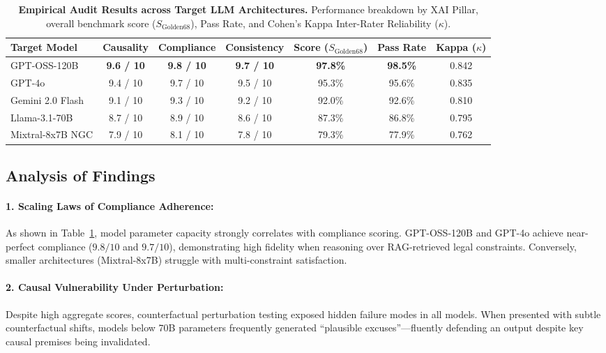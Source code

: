 \documentclass{article}
\begin{document}
\begin{table}[h]
\caption{\textbf{Empirical Audit Results across Target LLM Architectures.} Performance breakdown by XAI Pillar, overall benchmark score ($S_{\text{Golden68}}$), Pass Rate, and Cohen's Kappa Inter-Rater Reliability ($\kappa$).}
\label{tab:empirical_results}
\centering
\small
\begin{tabular}{lcccccc}
\toprule
\textbf{Target Model} & \textbf{Causality} & \textbf{Compliance} & \textbf{Consistency} & \textbf{Score ($S_{\text{Golden68}}$)} & \textbf{Pass Rate} & \textbf{Kappa ($\kappa$)} \\
\midrule
GPT-OSS-120B & \textbf{9.6 / 10} & \textbf{9.8 / 10} & \textbf{9.7 / 10} & \textbf{97.8\%} & \textbf{98.5\%} & 0.842 \\
GPT-4o & 9.4 / 10 & 9.7 / 10 & 9.5 / 10 & 95.3\% & 95.6\% & 0.835 \\
Gemini 2.0 Flash & 9.1 / 10 & 9.3 / 10 & 9.2 / 10 & 92.0\% & 92.6\% & 0.810 \\
Llama-3.1-70B & 8.7 / 10 & 8.9 / 10 & 8.6 / 10 & 87.3\% & 86.8\% & 0.795 \\
Mixtral-8x7B NGC & 7.9 / 10 & 8.1 / 10 & 7.8 / 10 & 79.3\% & 77.9\% & 0.762 \\
\bottomrule
\end{tabular}
\end{table}

\subsection{Analysis of Findings}

\paragraph{1. Scaling Laws of Compliance Adherence:}
As shown in Table~\ref{tab:empirical_results}, model parameter capacity strongly correlates with compliance scoring. GPT-OSS-120B and GPT-4o achieve near-perfect compliance ($9.8/10$ and $9.7/10$), demonstrating high fidelity when reasoning over RAG-retrieved legal constraints. Conversely, smaller architectures (Mixtral-8x7B) struggle with multi-constraint satisfaction.

\paragraph{2. Causal Vulnerability Under Perturbation:}
Despite high aggregate scores, counterfactual perturbation testing exposed hidden failure modes in all models. When presented with subtle counterfactual shifts, models below 70B parameters frequently generated ``plausible excuses''---fluently defending an output despite key causal premises being invalidated.
\end{document}
